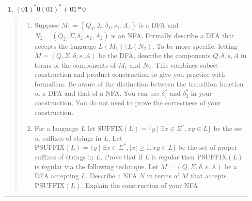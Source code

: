 \documentclass[11pt]{article}
\begin{document}
\begin{solution}
\begin{enumerate}
        \item $(01)^*0(01)^* + 01*0$
    \end{enumerate}
\end{solution}


\begin{quote}
    \begin{enumerate}
  \item Suppose $M_1=(Q_1,\Sigma, \delta_1, s_1, A_1)$ is a DFA and
    $N_2=(Q_2,\Sigma, \delta_2, s_2, A_2)$ is an NFA. Formally
    describe a DFA that accepts the language
    $L(M_1) \setminus L(N_2)$. To be more specific, letting
    $M = (Q,\Sigma,\delta,s,A)$ be the DFA, describe the components
    $Q,\delta,s,A$ in terms of the components of $M_1$ and $N_2$.
    This combines subset construction and product construction to give
    you practice with formalism. Be aware of the distinction between
    the transition function of a DFA and that of a NFA. You can use
    $\delta_1^*$ and $\delta_2^*$ in your construction. You do not
    need to prove the correctness of your construction.
  \item For a language $L$ let
    $\text{SUFFIX}(L) = \{ y \mid \exists x \in \Sigma^*, xy \in L\}$ be
    the set of suffixes of strings in $L$.  Let
    $\text{PSUFFIX}(L) = \{ y \mid \exists x \in \Sigma^*, |x| \ge 1, xy
    \in L\}$ be the set of proper suffixes of strings in $L$.  Prove
    that if $L$ is regular then $\text{PSUFFIX}(L)$ is regular via the
    following technique.  Let $M=(Q,\Sigma,\delta,s,A)$ be a DFA
    accepting $L$. Describe a NFA $N$ in terms of $M$ that accepts
    $\text{PSUFFIX}(L)$. Explain the construction of your NFA.
  \end{enumerate}
\end{quote}
\hrule
\end{document}
